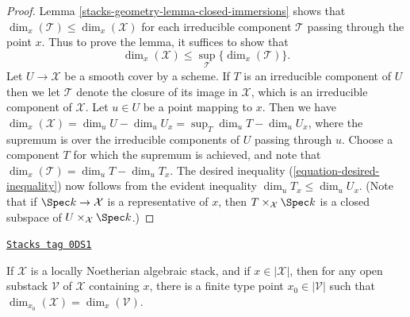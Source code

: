 \begin{proof}
Lemma \ref{stacks-geometry-lemma-closed-immersions}
shows that
$\dim_x (\mathcal{T}) \leq \dim_x(\mathcal{X})$ for each
irreducible component $\mathcal{T}$ passing through
the point $x$.   Thus to prove the lemma,
it suffices to show that
\begin{equation}
\label{equation-desired-inequality}
\dim_x(\mathcal{X}) \leq
\sup_{\mathcal{T}} \{\dim_x(\mathcal{T})\}.
\end{equation}
Let $U\to\mathcal{X}$ be a smooth cover by a scheme. If $T$ is an irreducible
component of $U$ then we let $\mathcal{T}$ denote the closure of its image
in $\mathcal{X}$, which is an irreducible component of $\mathcal{X}$. Let
$u \in U$ be
a point mapping to $x$. Then we have
$\dim_x(\mathcal{X})=\dim_uU-\dim_uU_x=\sup_T\dim_uT-\dim_uU_x$, where the
supremum is over the irreducible components of $U$ passing
through $u$. Choose a component $T$ for which the supremum
is achieved, and note that
$\dim_x(\mathcal{T})=\dim_uT-\dim_u T_x$.
The desired inequality (\ref{equation-desired-inequality})
now follows from the evident inequality $\dim_u T_x \leq \dim_u U_x.$
(Note that if $\Spec k \to \mathcal{X}$ is a representative of $x$,
then $T\times_{\mathcal{X}} \Spec k$ is a closed subspace of
$U\times_{\mathcal{X}}
\Spec k$.)
\end{proof}

\begin{lemma}
\label{stacks-geometry-lemma-dimension-at-finite-type-point}
\href{https://stacks.math.columbia.edu/tag/0DS1}{\texttt{Stacks tag 0DS1}}

If $\mathcal{X}$ is a locally Noetherian algebraic stack, and if
$x \in |\mathcal{X}|$, then
for any open substack $\mathcal{V}$ of $\mathcal{X}$ containing $x$,
there is a finite type point $x_0 \in |\mathcal{V}|$ such that
$\dim_{x_0}(\mathcal{X}) = \dim_x(\mathcal{V})$.
\end{lemma}


